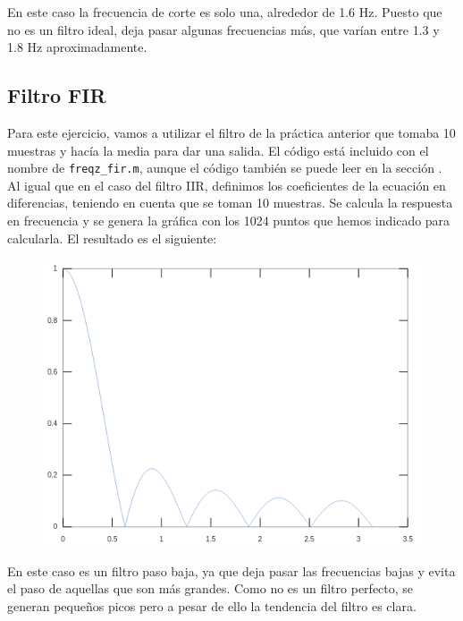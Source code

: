\documentclass[11pt,a4paper]{article}
\begin{document}
En este caso la frecuencia de corte es solo una, alrededor de 1.6 Hz. Puesto que no es un filtro ideal, deja pasar algunas frecuencias más, que varían entre 1.3 y 1.8 Hz aproximadamente.

\subsection{Filtro FIR}

Para este ejercicio, vamos a utilizar el filtro de la práctica anterior que tomaba 10 muestras y hacía la media para dar una salida. El código está incluido con el nombre de \texttt{freqz\_fir.m}, aunque el código también se puede leer en la sección \color{deepred}\color{black}.\\

Al igual que en el caso del filtro IIR, definimos los coeficientes de la ecuación en diferencias, teniendo en cuenta que se toman 10 muestras. Se calcula la respuesta en frecuencia y se genera la gráfica con los 1024 puntos que hemos indicado para calcularla. El resultado es el siguiente:

\begin{figure}[H]
	\centering
	\includegraphics[scale=0.4]{img/freqz-fir.png}
\end{figure}

En este caso es un filtro paso baja, ya que deja pasar las frecuencias bajas y evita el paso de aquellas que son más grandes. Como no es un filtro perfecto, se generan pequeños picos pero a pesar de ello la tendencia del filtro es clara.\\
\end{document}
